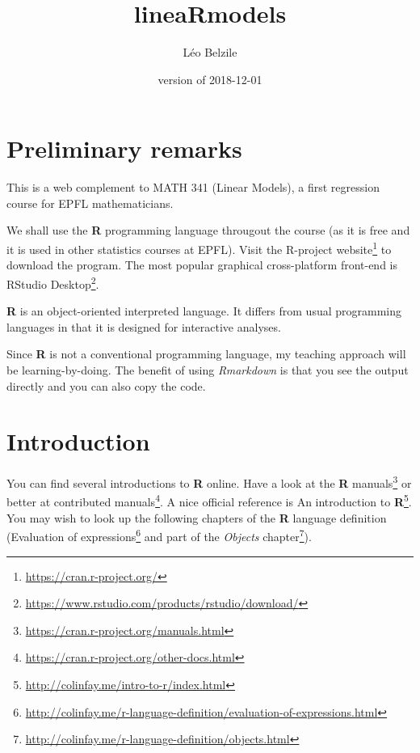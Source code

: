 \documentclass[]{book}
\title{lineaRmodels}
\author{Léo Belzile}
\date{version of 2018-12-01}
\let\rmarkdownfootnote\footnote%
\def\footnote{\protect\rmarkdownfootnote}
\renewcommand{\href}[2]{#2\footnote{\url{#1}}}
\theoremstyle{definition}
\theoremstyle{definition}
\theoremstyle{definition}
\theoremstyle{remark}
\begin{document}
\maketitle

{
\setcounter{tocdepth}{1}
\tableofcontents
}
\hypertarget{preliminary-remarks}{%
\chapter*{Preliminary remarks}\label{preliminary-remarks}}

This is a web complement to MATH 341 (Linear Models), a first regression
course for EPFL mathematicians.

We shall use the \textbf{R} programming language througout the course
(as it is free and it is used in other statistics courses at EPFL).
Visit \href{https://cran.r-project.org/}{the R-project website} to
download the program. The most popular graphical cross-platform
front-end is
\href{https://www.rstudio.com/products/rstudio/download/}{RStudio
Desktop}.

\textbf{R} is an object-oriented interpreted language. It differs from
usual programming languages in that it is designed for interactive
analyses.

Since \textbf{R} is not a conventional programming language, my teaching
approach will be learning-by-doing. The benefit of using
\emph{Rmarkdown} is that you see the output directly and you can also
copy the code.

\newcommand{\bs}[1]{\boldsymbol{#1}}
\newcommand{\Hmat}{\mathbf{H}}
\newcommand{\Mmat}{\mathbf{M}}
\newcommand{\mX}{\mathbf{X}}
\newcommand{\bX}{{\mathbf{X}}}
\newcommand{\bx}{{\mathbf{x}}}
\newcommand{\by}{{\boldsymbol{y}}}
\newcommand{\bY}{{\boldsymbol{Y}}}
\newcommand{\eps}{\varepsilon}
\newcommand{\beps}{\boldsymbol{\varepsilon}}
\newcommand{\bbeta}{\boldsymbol{\beta}}
\newcommand{\hbb}{\hat{\boldsymbol{\beta}}}
\newcommand{\limni}{\lim_{n \ra \infty}}
\newcommand{\Sp}{\mathscr{S}}
\newcommand{\E}[2][]{{\mathsf E}_{#1}\left(#2\right)}
\newcommand{\Va}[2][]{{\mathsf{Var}_{#1}}\left(#2\right)}
\newcommand{\I}[1]{{\mathbf 1}_{#1}}

\hypertarget{introduction}{%
\chapter{Introduction}\label{introduction}}

You can find several introductions to \textbf{R} online. Have a look at
the \href{https://cran.r-project.org/manuals.html}{\textbf{R} manuals}
or better at
\href{https://cran.r-project.org/other-docs.html}{contributed manuals}.
A nice official reference is
\href{http://colinfay.me/intro-to-r/index.html}{An introduction to
\textbf{R}}. You may wish to look up the following chapters of the
\textbf{R} language definition
(\href{http://colinfay.me/r-language-definition/evaluation-of-expressions.html}{Evaluation
of expressions} and part of the
\href{http://colinfay.me/r-language-definition/objects.html}{\emph{Objects}
chapter}).
\end{document}
